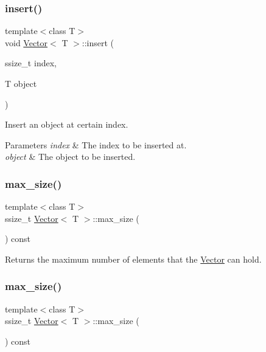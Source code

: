 \subsubsection{\texorpdfstring{insert()}{insert()}\hspace{0.1cm}{\footnotesize\ttfamily [2/2]}}
{\footnotesize\ttfamily template$<$class T$>$ \\
void \hyperlink{classVector}{Vector}$<$ T $>$\+::insert (\begin{DoxyParamCaption}\item[{ssize\+\_\+t}]{index,  }\item[{T}]{object }\end{DoxyParamCaption})\hspace{0.3cm}{\ttfamily [inline]}}

Insert an object at certain index. 
\begin{DoxyParams}{Parameters}
{\em index} & The index to be inserted at. \\
\hline
{\em object} & The object to be inserted. \\
\hline
\end{DoxyParams}
\mbox{\label{classVector_ab10488a501e7d2073faf8d729fc1d416}} 
\subsubsection{\texorpdfstring{max\+\_\+size()}{max\_size()}\hspace{0.1cm}{\footnotesize\ttfamily [1/2]}}
{\footnotesize\ttfamily template$<$class T$>$ \\
ssize\+\_\+t \hyperlink{classVector}{Vector}$<$ T $>$\+::max\+\_\+size (\begin{DoxyParamCaption}{ }\end{DoxyParamCaption}) const\hspace{0.3cm}{\ttfamily [inline]}}

Returns the maximum number of elements that the \hyperlink{classVector}{Vector} can hold. \mbox{\label{classVector_ab10488a501e7d2073faf8d729fc1d416}} 
\subsubsection{\texorpdfstring{max\+\_\+size()}{max\_size()}\hspace{0.1cm}{\footnotesize\ttfamily [2/2]}}
{\footnotesize\ttfamily template$<$class T$>$ \\
ssize\+\_\+t \hyperlink{classVector}{Vector}$<$ T $>$\+::max\+\_\+size (\begin{DoxyParamCaption}{ }\end{DoxyParamCaption}) const\hspace{0.3cm}{\ttfamily [inline]}}

